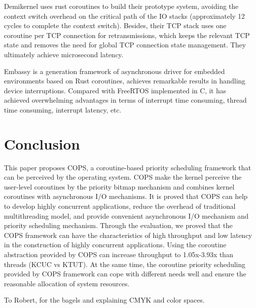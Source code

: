 \documentclass[sigconf,review,anonymous]{acmart}
\begin{document}
Demikernel\cite{zhang_demikernel_2021} uses rust coroutines to build their prototype system, avoiding the context switch overhead on the critical path of the IO stacks (approximately 12 cycles to complete the context switch). Besides, their TCP stack uses one coroutine per TCP connection for retransmissions, which keeps the relevant TCP state and removes the need for global TCP connection state management. They ultimately achieve microsecond latency.

Embassy\cite{embassy} is a generation framework of asynchronous driver for embedded environments based on Rust coroutines, achieves remarkable results in handling device interruptions. Compared with FreeRTOS implemented in C, it has achieved overwhelming advantages in terms of interrupt time consuming, thread time consuming, interrupt latency, etc.



\section{Conclusion}

This paper proposes COPS, a coroutine-based priority scheduling framework that can be perceived by the operating system. COPS make the kernel perceive the user-level coroutines by the priority bitmap mechanism and combines kernel coroutines with asynchronous I/O mechanisms. It is proved that COPS can help to develop highly concurrent applications, reduce the overhead of traditional multithreading model, and provide convenient asynchronous I/O mechanism and priority scheduling mechanism. Through the evaluation, we proved that the COPS framework can have the characteristics of high throughput and low latency in the construction of highly concurrent applications. Using the coroutine abstraction provided by COPS can increase throughput to 1.05x-3.93x than threads (KCUC vs KTUT). At the same time, the coroutine priority scheduling provided by COPS framework can cope with different needs well and ensure the reasonable allocation of system resources.

\begin{acks}
To Robert, for the bagels and explaining CMYK and color spaces.
\end{acks}

\balance




\appendix
\end{document}

